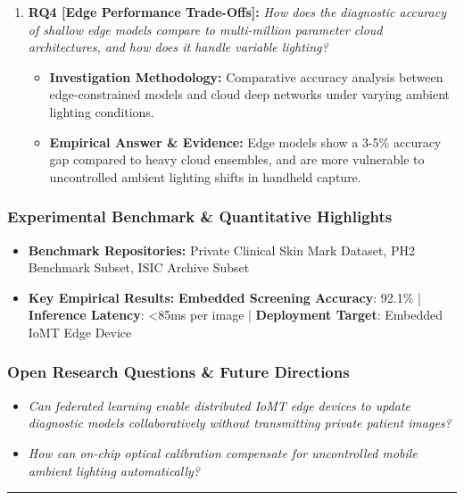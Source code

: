 \begin{enumerate}[label=\textbf{\arabic*.}, leftmargin=*]
\begin{itemize}[leftmargin=1.5em]
  \end{itemize}
  \item \textbf{RQ4 [Edge Performance Trade-Offs]:} \textit{How does the diagnostic accuracy of shallow edge models compare to multi-million parameter cloud architectures, and how does it handle variable lighting?}
  \begin{itemize}[leftmargin=1.5em]
    \item \textbf{Investigation Methodology:} Comparative accuracy analysis between edge-constrained models and cloud deep networks under varying ambient lighting conditions.
    \item \textbf{Empirical Answer \& Evidence:} Edge models show a 3-5\% accuracy gap compared to heavy cloud ensembles, and are more vulnerable to uncontrolled ambient lighting shifts in handheld capture.
  \end{itemize}
\end{enumerate}

\subsubsection*{Experimental Benchmark \& Quantitative Highlights}
\begin{itemize}[leftmargin=*]
  \item \textbf{Benchmark Repositories:} Private Clinical Skin Mark Dataset, PH2 Benchmark Subset, ISIC Archive Subset
  \item \textbf{Key Empirical Results:} \textbf{Embedded Screening Accuracy}: 92.1\% \quad | \quad \textbf{Inference Latency}: <85ms per image \quad | \quad \textbf{Deployment Target}: Embedded IoMT Edge Device
\end{itemize}

\subsubsection*{Open Research Questions \& Future Directions}
\begin{itemize}[leftmargin=*]
  \item \textit{Can federated learning enable distributed IoMT edge devices to update diagnostic models collaboratively without transmitting private patient images?}
  \item \textit{How can on-chip optical calibration compensate for uncontrolled mobile ambient lighting automatically?}
\end{itemize}
\vspace{0.8em}\hrule\vspace{1.2em}
